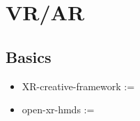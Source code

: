 \chapter{VR/AR}
    \section{Basics}
        \begin{itemize}
            \item XR-creative-framework :=  
            \item open-xr-hmds :=
        \end{itemize}

    \section{}